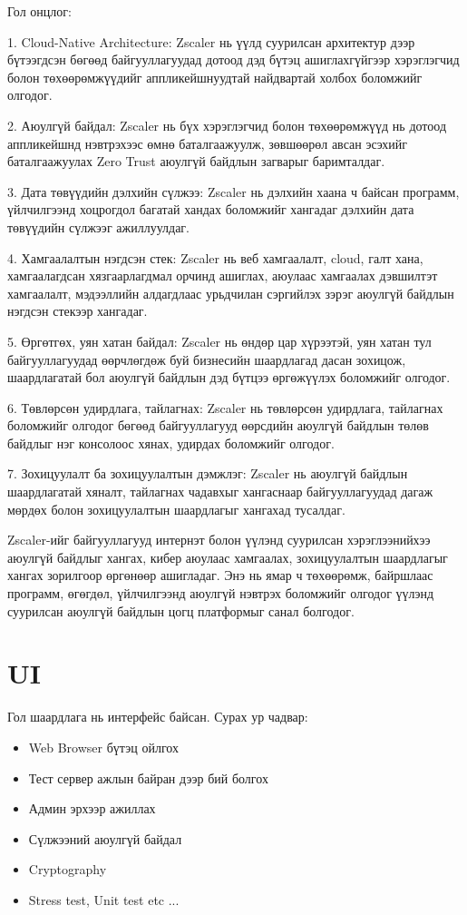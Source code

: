 							Гол онцлог:
					
							1. Cloud-Native Architecture: Zscaler нь үүлд суурилсан архитектур дээр бүтээгдсэн бөгөөд байгууллагуудад дотоод дэд бүтэц ашиглахгүйгээр хэрэглэгчид болон төхөөрөмжүүдийг аппликейшнуудтай найдвартай холбох боломжийг олгодог.
							
							2. Аюулгүй байдал: Zscaler нь бүх хэрэглэгчид болон төхөөрөмжүүд нь дотоод аппликейшнд нэвтрэхээс өмнө баталгаажуулж, зөвшөөрөл авсан эсэхийг баталгаажуулах Zero Trust аюулгүй байдлын загварыг баримталдаг.
							
							3. Дата төвүүдийн дэлхийн сүлжээ: Zscaler нь дэлхийн хаана ч байсан программ, үйлчилгээнд хоцрогдол багатай хандах боломжийг хангадаг дэлхийн дата төвүүдийн сүлжээг ажиллуулдаг.
							
							4. Хамгаалалтын нэгдсэн стек: Zscaler нь веб хамгаалалт, cloud, галт хана, хамгаалагдсан хязгаарлагдмал орчинд ашиглах, аюулаас хамгаалах дэвшилтэт хамгаалалт, мэдээллийн алдагдлаас урьдчилан сэргийлэх зэрэг аюулгүй байдлын нэгдсэн стекээр хангадаг.
							
							5. Өргөтгөх, уян хатан байдал: Zscaler нь өндөр цар хүрээтэй, уян хатан тул байгууллагуудад өөрчлөгдөж буй бизнесийн шаардлагад дасан зохицож, шаардлагатай бол аюулгүй байдлын дэд бүтцээ өргөжүүлэх боломжийг олгодог.
							
							6. Төвлөрсөн удирдлага, тайлагнах: Zscaler нь төвлөрсөн удирдлага, тайлагнах боломжийг олгодог бөгөөд байгууллагууд өөрсдийн аюулгүй байдлын төлөв байдлыг нэг консолоос хянах, удирдах боломжийг олгодог.
							
							7. Зохицуулалт ба зохицуулалтын дэмжлэг: Zscaler нь аюулгүй байдлын шаардлагатай хяналт, тайлагнах чадавхыг хангаснаар байгууллагуудад дагаж мөрдөх болон зохицуулалтын шаардлагыг хангахад тусалдаг.
							
							Zscaler-ийг байгууллагууд интернэт болон үүлэнд суурилсан хэрэглээнийхээ аюулгүй байдлыг хангах, кибер аюулаас хамгаалах, зохицуулалтын шаардлагыг хангах зорилгоор өргөнөөр ашигладаг. Энэ нь ямар ч төхөөрөмж, байршлаас программ, өгөгдөл, үйлчилгээнд аюулгүй нэвтрэх боломжийг олгодог үүлэнд суурилсан аюулгүй байдлын цогц платформыг санал болгодог. 
	\pagebreak
			
\section{UI}
Гол шаардлага нь интерфейс байсан.
Сурах ур чадвар: 
\begin{itemize}
    \item Web Browser бүтэц ойлгох
    \item Тест сервер ажлын байран дээр бий болгох
    \item Админ эрхээр ажиллах
    \item Сүлжээний аюулгүй байдал
    \item Cryptography
    \item Stress test, Unit test etc ...
\end{itemize}

